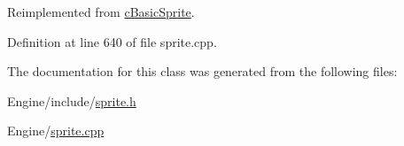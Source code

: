 Reimplemented from \hyperlink{classc_basic_sprite_a6f01984a6af849dc95cc9ec1f3528074}{c\-Basic\-Sprite}.



Definition at line 640 of file sprite.\-cpp.



The documentation for this class was generated from the following files\-:\begin{DoxyCompactItemize}
\item 
Engine/include/\hyperlink{sprite_8h}{sprite.\-h}\item 
Engine/\hyperlink{sprite_8cpp}{sprite.\-cpp}\end{DoxyCompactItemize}
